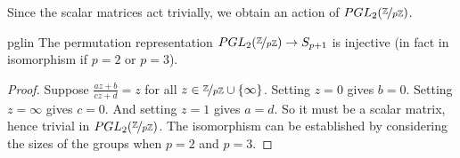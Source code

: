 Since the scalar matrices act trivially, we obtain an action of \(PGL_2(\nicefrac{\mathbb{Z}}{p\mathbb{Z}})\).
\begin{lemma}{}{pglin}
    The permutation representation \(PGL_2(\nicefrac{\mathbb{Z}}{p\mathbb{Z}})\to S_{p + 1}\) is injective (in fact in isomorphism if \(p = 2\) or \(p = 3\)).
\end{lemma}
\begin{proof}
    Suppose \(\frac{az + b}{cz + d} = z\) for all \(z \in \nicefrac{\mathbb{\MakeUppercase{Z}}}{p \mathbb{\MakeUppercase{Z}} }\cup \{\infty\}\). Setting \(z = 0\) gives \(b = 0\). Setting \(z = \infty\) gives \(c = 0\). And setting \(z= 1\) gives \(a = d\). So it must be a scalar matrix, hence trivial in \(PGL_2(\nicefrac{\mathbb{\MakeUppercase{Z}}}{p\mathbb{\MakeUppercase{z}}})\). The isomorphism can be established by considering the sizes of the groups when \(p = 2\) and \(p = 3\).
\end{proof}